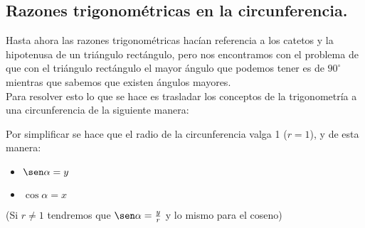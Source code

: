 \documentclass[a4paper,11pt,answers]{exam}
\newcommand{\degree}{^\circ}
\begin{document}
\subsection{Razones trigonométricas en la circunferencia.}
Hasta ahora las razones trigonométricas hacían referencia a los catetos y la hipotenusa de un triángulo rectángulo, pero nos encontramos con el problema de que con el triángulo rectángulo el mayor ángulo que podemos tener es de $90\degree$ mientras que sabemos que existen ángulos mayores.\\
Para resolver esto lo que se hace es trasladar los conceptos de la trigonometría a una circunferencia de la siguiente manera:
\begin{center}
\end{center}
Por simplificar se hace que el radio de la circunferencia valga 1 ($r = 1$), y de esta manera:
\begin{itemize}
\item $\sen \alpha = y$
\item $\cos \alpha = x$
\end{itemize}
(Si $r \neq 1$ tendremos que $\sen \alpha = \frac{y}{r}$ y lo mismo para el coseno)
\end{document}
